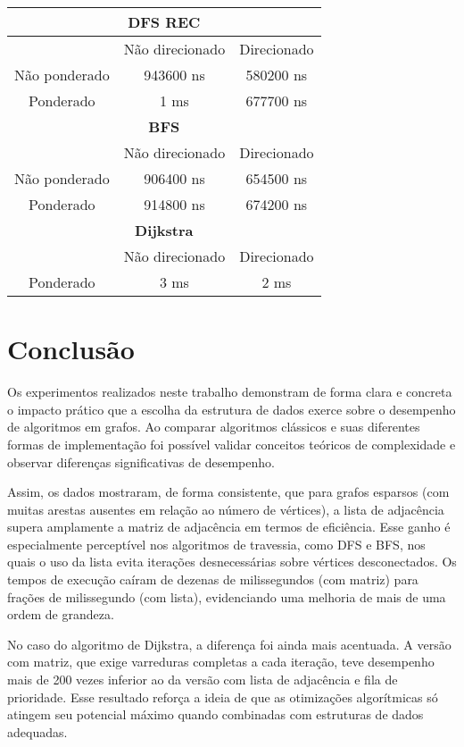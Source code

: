 \documentclass{sbc2023}%
\begin{document}
\begin{tabular}{|c|c|c|}
\hline
\multicolumn{3}{|c|}{\textbf{DFS REC}} \\
\hline
 & Não direcionado & Direcionado \\
\hline
Não ponderado & 943600 ns & 580200 ns \\
Ponderado     & 1 ms      & 677700 ns \\
\hline
\multicolumn{3}{|c|}{\textbf{BFS}} \\
\hline
 & Não direcionado & Direcionado \\
\hline
Não ponderado & 906400 ns & 654500 ns \\
Ponderado     & 914800 ns & 674200 ns \\
\hline
\multicolumn{3}{|c|}{\textbf{Dijkstra}} \\
\hline
 & Não direcionado & Direcionado \\
\hline
Ponderado & 3 ms & 2 ms \\
\hline
\end{tabular}

\vspace{1cm} 


\section{Conclusão}

Os experimentos realizados neste trabalho demonstram de forma clara e concreta o impacto prático que a escolha da estrutura de dados exerce sobre o desempenho de algoritmos em grafos. Ao comparar algoritmos clássicos e suas diferentes formas de implementação foi possível validar conceitos teóricos de complexidade e observar diferenças significativas de desempenho.

Assim, os dados mostraram, de forma consistente, que para grafos esparsos (com muitas arestas ausentes em relação ao número de vértices), a lista de adjacência supera amplamente a matriz de adjacência em termos de eficiência. Esse ganho é especialmente perceptível nos algoritmos de travessia, como DFS e BFS, nos quais o uso da lista evita iterações desnecessárias sobre vértices desconectados. Os tempos de execução caíram de dezenas de milissegundos (com matriz) para frações de milissegundo (com lista), evidenciando uma melhoria de mais de uma ordem de grandeza.

No caso do algoritmo de Dijkstra, a diferença foi ainda mais acentuada. A versão com matriz, que exige varreduras completas a cada iteração, teve desempenho mais de 200 vezes inferior ao da versão com lista de adjacência e fila de prioridade. Esse resultado reforça a ideia de que as otimizações algorítmicas só atingem seu potencial máximo quando combinadas com estruturas de dados adequadas.
\end{document}
